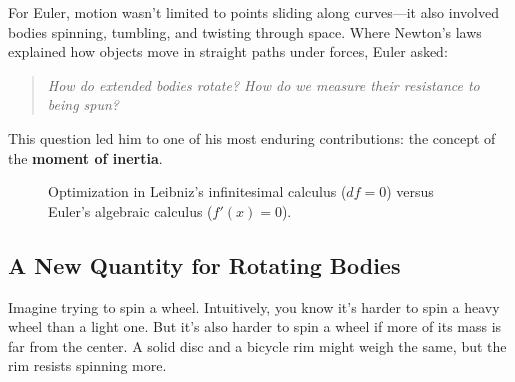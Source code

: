 For Euler, motion wasn’t limited to points sliding along curves—it also involved bodies spinning, tumbling, and twisting through space.  Where Newton’s laws explained how objects move in straight paths under forces, Euler asked:

\begin{quote}
\textit{How do extended bodies rotate? How do we measure their resistance to being spun?}
\end{quote}

This question led him to one of his most enduring contributions: the concept of the \textbf{moment of inertia}.  


\begin{figure}[H]
    \centering
    \caption{Optimization in Leibniz’s infinitesimal calculus (\(df=0\)) versus Euler’s algebraic calculus (\(f'(x)=0\)).}
    \label{fig:leibniz-euler-optimization-vertical}
\end{figure}
  



\subsection{A New Quantity for Rotating Bodies}

Imagine trying to spin a wheel. Intuitively, you know it’s harder to spin a heavy wheel than a light one. But 
it’s also harder to spin a wheel if more of its mass is far from the center. A solid disc and a bicycle rim 
might weigh the same, but the rim resists spinning more.

